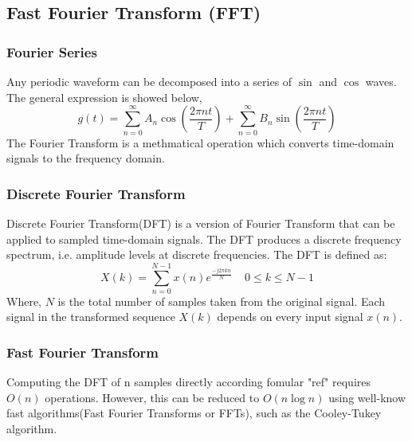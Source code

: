 \subsection{Fast Fourier Transform (FFT)}
%
\subsubsection{Fourier Series}
Any periodic waveform can be decomposed into a series of \begin{math} \sin \end{math} and \begin{math} \cos \end{math} waves. The general expression is showed below,
\begin{equation}
g(t) = \sum_{n=0}^\infty A_n\cos (\frac{2\pi nt}{T}) + \sum_{n=0}^\infty B_n\sin (\frac{2\pi nt}{T})
\end{equation}
The Fourier Transform is a methmatical operation which converts time-domain signals to the frequency domain.
%
%
\subsubsection{Discrete Fourier Transform}
Discrete Fourier Transform(DFT) is a version of Fourier Transform that can be applied to sampled time-domain signals. The DFT produces a discrete frequency spectrum, i.e. amplitude levels at discrete frequencies. The DFT is defined as:
\begin{equation}
X(k) = \sum_{n=0}^{N-1}x(n)e^{\frac{-j2\pi kn}{N}}\;\;\;\; 0\leq k \leq N-1
\end{equation}
Where, \begin{math} N \end{math} is the total number of samples taken from the original signal. Each signal in the transformed sequence $X(k)$ depends on every input signal $x(n)$.
%
%
\subsubsection{Fast Fourier Transform}
Computing the DFT of n samples directly according fomular "ref" requires \begin{math} O(n) \end{math} operations. However, this can be reduced to \begin{math} O(n\log n) \end{math} using well-know fast algorithms(Fast Fourier Transforms or FFTs), such as the Cooley-Tukey algorithm\cite{Cooley-TukeyAlgorithm}.
%
%
